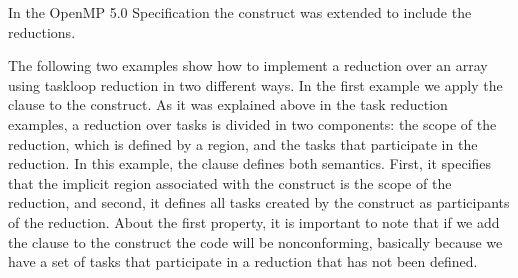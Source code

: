 In the OpenMP 5.0 Specification the  construct
was extended to include the reductions.

The following two examples show how to implement a reduction over an array
using taskloop reduction in two different ways.
In the first
example we apply the  clause to the  construct. As it was
explained above in the task reduction examples, a reduction over tasks is
divided in two components: the scope of the reduction, which is defined by a
 region, and the tasks that participate in the reduction. In this
example, the  clause defines both semantics. First, it specifies that
the implicit  region associated with the  construct is the scope of the
reduction, and second, it defines all tasks created by the  construct as
participants of the reduction. About the first property, it is important to note
that if we add the  clause to the  construct the code will be
nonconforming, basically because we have a set of tasks that participate in a
reduction that has not been defined.



